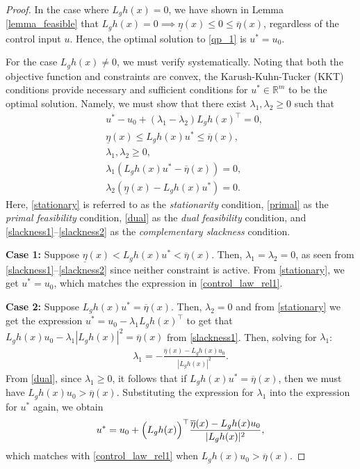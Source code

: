 \documentclass[letterpaper, 10 pt, conference]{ieeeconf}
\newcommand{\TODO}[1]{{\color{black}#1}}
\begin{document}
\begin{proof}
    In the case where $L_g h(x) = 0$, we have shown in Lemma \ref{lemma_feasible} that $L_g h(x) = 0 \implies \underline{\eta}(x) \leq 0 \leq \overline{\eta}(x)$, regardless of the control input $u$. Hence, the optimal solution to \eqref{qp_1} is $u^* = u_0$.  

    For the case $L_gh(x) \neq 0$, we must verify systematically. Noting that both the objective function and constraints are convex, the Karush-Kuhn-Tucker (KKT) conditions \cite{boyd2004convex} provide necessary and sufficient conditions for $u^* \in \mathbb{R}^m$ to be the optimal solution. Namely, we must show that there exist $\lambda_1, \lambda_2 \geq 0$ such that  
    \TODO{
    \begin{align}
       & u^* - u_0 + (\lambda_1 - \lambda_2)L_g h(x)^\top = 0, \label{stationary} \\
        &\underline{\eta}(x) \leq L_g h(x) u^* \leq \overline{\eta}(x), \label{primal} \\
        &\lambda_1, \lambda_2 \geq 0, \label{dual} \\
        &\lambda_1 (L_g h(x) u^* - \overline{\eta}(x)) = 0, \label{slackness1} \\
        &\lambda_2 (\underline{\eta}(x) - L_g h(x) u^*) = 0. \label{slackness2}
    \end{align}  
    }
    Here, \eqref{stationary} is referred to as the \textit{stationarity} condition, \eqref{primal} as the \textit{primal feasibility} condition, \eqref{dual} as the \textit{dual feasibility} condition, and \eqref{slackness1}--\eqref{slackness2} as the \textit{complementary slackness} condition. 
    
    \textbf{Case 1:} Suppose $\underline{\eta}(x) < L_gh(x)u^* < \overline{\eta}(x)$. Then, $\lambda_1 = \lambda_2 = 0$, as seen from \eqref{slackness1}--\eqref{slackness2} since neither constraint is active. From \eqref{stationary}, we get $u^* = u_0$, which matches the expression in \eqref{control_law_rel1}.
    
    \textbf{Case 2:} Suppose $L_gh(x)u^* = \overline{\eta}(x)$. Then, $\lambda_2 = 0$ and from \eqref{stationary} we get the expression $u^* = u_0- \lambda_1L_gh(x)^\top$ to get that $L_gh(x)u_0 - \lambda_1|L_gh(x)|^2 = \overline{\eta}(x)$ from \eqref{slackness1}. Then, solving for $\lambda_1$:
    \begin{align}
        \lambda_1 = -\frac{\overline{\eta}(x)-L_gh(x)u_0}{|L_gh(x)|^2}.
    \end{align}
    From \eqref{dual}, since $\lambda_1 \geq 0$, it follows that if $L_g h(x) u^* = \overline{\eta}(x)$, then we must have $L_g h(x) u_0 > \overline{\eta}(x)$. Substituting the expression for $\lambda_1$ into the expression for $u^*$ again, we obtain  
    \begin{align}
        u^* = u_0 + \Bigl(L_g h(x)\Bigr)^\top \frac{\overline{\eta}(x) - L_g h(x) u_0}{|L_g h(x)|^2},
    \end{align}  
    which matches with \eqref{control_law_rel1} when $L_g h(x) u_0 > \overline{\eta}(x)$.
    

\end{proof}
\end{document}
